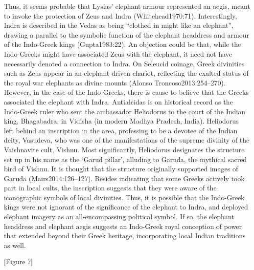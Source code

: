 \documentclass{ijsra}
\begin{document}
Thus, it seems probable that Lysias’ elephant armour represented an aegis, meant to invoke the protection of Zeus and Indra (Whitehead1970:71).
Interestingly, Indra is described in the Vedas as being “clothed in might like an elephant”, drawing a parallel to
the symbolic function of the elephant headdress and armour of the Indo-Greek kings (Gupta1983:22). 
An objection could be that, while the Indo-Greeks might have associated Zeus with the elephant,
it need not have necessarily denoted a connection to Indra. 
On Seleucid coinage, Greek divinities such as Zeus appear in an elephant driven chariot,
reflecting the exalted status of the royal war elephants as divine mounts (Alonso Troncoso2013:254–270). 
However, in the case of the Indo-Greeks, there is cause to believe that the Greeks associated the elephant with Indra. 
Antialcidas is on historical record as the Indo-Greek ruler who sent the ambassador Heliodorus to the court of the Indian king,
Bhagabadra, in Vidisha (in modern Madhya Pradesh, India). 
Heliodorus left behind an inscription in the area, professing to be a devotee of the Indian deity, Vasudeva,
who was one of the manifestations of the supreme divinity of the Vaishnavite cult, Vishnu.
Most significantly, Heliodorus designates the structure set up in his name as the ‘Garud pillar’,
alluding to Garuda, the mythical sacred bird of Vishnu. 
It is thought that the structure originally supported images of Garuda (Mairs2014:126–127). 
Besides indicating that some Greeks actively took part in local cults, the inscription suggests that they were aware of
the iconographic symbols of local divinities. 
Thus, it is possible that the Indo-Greek kings were not ignorant of the significance of the elephant to Indra,
and deployed elephant imagery as an all-encompassing political symbol. 
If so, the elephant headdress and elephant aegis suggests an Indo-Greek royal conception of power that extended beyond
their Greek heritage, incorporating local Indian traditions as well.

[Figure 7]
\end{document}
